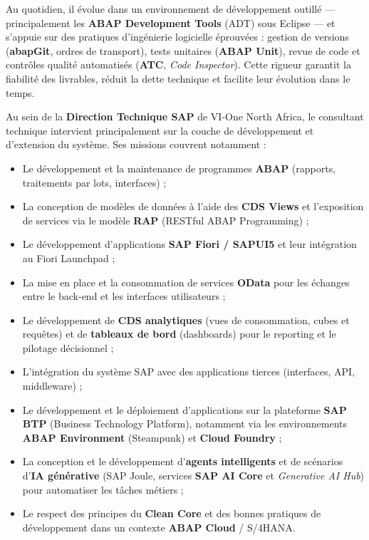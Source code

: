 \documentclass[12pt,a4paper,oneside]{report}
\begin{document}
Au quotidien, il \'evolue dans un environnement de d\'eveloppement outill\'e ---
principalement les \textbf{ABAP Development Tools} (ADT) sous Eclipse --- et s'appuie
sur des pratiques d'ing\'enierie logicielle \'eprouv\'ees : gestion de versions
(\textbf{abapGit}, ordres de transport), tests unitaires (\textbf{ABAP Unit}), revue
de code et contr\^oles qualit\'e automatis\'es (\textbf{ATC}, \textit{Code Inspector}).
Cette rigueur garantit la fiabilit\'e des livrables, r\'eduit la dette technique et
facilite leur \'evolution dans le temps.

Au sein de la \textbf{Direction Technique SAP} de VI-One North Africa, le consultant
technique intervient principalement sur la couche de d\'eveloppement et d'extension
du syst\`eme. Ses missions couvrent notamment :

\begin{itemize}[label=---, itemsep=0.15em]
	\item Le d\'eveloppement et la maintenance de programmes \textbf{ABAP} (rapports,
	      traitements par lots, interfaces) ;
	\item La conception de mod\`eles de donn\'ees \`a l'aide des \textbf{CDS Views} et
	      l'exposition de services via le mod\`ele \textbf{RAP} (RESTful ABAP Programming) ;
	\item Le d\'eveloppement d'applications \textbf{SAP Fiori / SAPUI5} et leur
	      int\'egration au Fiori Launchpad ;
	\item La mise en place et la consommation de services \textbf{OData} pour les
	      \'echanges entre le back-end et les interfaces utilisateurs ;
	\item Le d\'eveloppement de \textbf{CDS analytiques} (vues de consommation,
	      cubes et requ\^etes) et de \textbf{tableaux de bord} (dashboards) pour le
	      reporting et le pilotage d\'ecisionnel ;
	\item L'int\'egration du syst\`eme SAP avec des applications tierces
	      (interfaces, API, middleware) ;
	\item Le d\'eveloppement et le d\'eploiement d'applications sur la plateforme
	      \textbf{SAP BTP} (Business Technology Platform), notamment via les
	      environnements \textbf{ABAP Environment} (Steampunk) et \textbf{Cloud Foundry} ;
	\item La conception et le d\'eveloppement d'\textbf{agents intelligents} et de
	      sc\'enarios d'\textbf{IA g\'en\'erative} (SAP Joule, services \textbf{SAP AI Core}
	      et \textit{Generative AI Hub}) pour automatiser les t\^aches m\'etiers ;
	\item Le respect des principes du \textbf{Clean Core} et des bonnes pratiques de
	      d\'eveloppement dans un contexte \textbf{ABAP Cloud} / S/4HANA.
\end{itemize}
\end{document}
